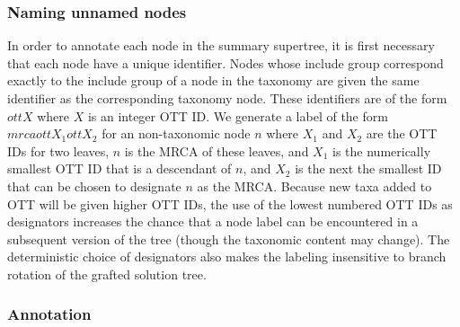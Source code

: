 \documentclass[fleqn,12pt,lineno,english]{wlpeerj}
\providecommand{\DIFdelend}{} %
\begin{document}
\DIFdelend \subsubsection{Naming unnamed nodes}

In order to annotate each node in the summary supertree, it is first
necessary that each node have a unique identifier. Nodes whose include
group correspond exactly to the include group of a node in the taxonomy
are given the same identifier as the corresponding taxonomy node.
These identifiers are of the form $ottX$ where $X$ is an integer
OTT ID. We generate a label of the form $mrcaottX_{1}ottX_{2}$ for
an non-taxonomic node $n$ where $X_{1}$ and $X_{2}$ are the OTT
IDs for two leaves, $n$ is the MRCA of these leaves, and $X_{1}$
is the numerically smallest OTT ID that is a descendant of $n$, and
$X_{2}$ is the next the smallest ID that can be chosen to designate
$n$ as the MRCA. Because new taxa added to OTT will be given higher
OTT IDs, the use of the lowest numbered OTT IDs as designators increases
the chance that a node label can be encountered in a subsequent version
of the tree (though the taxonomic content may change). The deterministic
choice of designators also makes the labeling insensitive to branch
rotation of the grafted solution tree.

\subsubsection{Annotation}\label{sec:Annotation}
\end{document}
